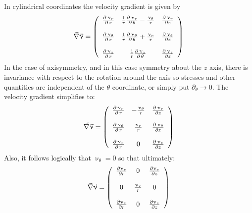 In cylindrical coordinates the velocity gradient is given by 
\begin{equation}
\vec\nabla \vec{\upnu}  =
\left(
\begin{array}{ccc}
{\partial \, \upnu_r \over \partial \, r} &
{1 \over r} {\partial \, \upnu_r \over \partial \, \theta} - {\upnu_{\theta} \over r} &
{\partial \, \upnu_r \over \partial z} \\
\\
{\partial \, \upnu_{\theta} \over \partial \, r} &
{1 \over r} {\partial \, \upnu_{\theta} \over \partial \, \theta} + 
{\upnu_r \over r} &
{\partial \, \upnu_{\theta} \over \partial z} \\
\\
{\partial \, \upnu_{z} \over \partial \, r} &
{1 \over r} {\partial \, \upnu_{z} \over \partial \, \theta} &
{\partial \, \upnu_{z} \over \partial z}
\end{array}
\right)
\end{equation}
In the case of axisymmetry, and in this case symmetry about the $z$ axis, there is invariance with respect to the rotation around the axis so stresses and other quantities are independent of the $\theta$ coordinate, or simply put $\partial_\theta \rightarrow 0$.
The velocity gradient simplifies to:
\begin{equation}
\vec\nabla \vec{\upnu}  =
\left(
\begin{array}{ccc}
{\partial \, \upnu_r \over \partial \, r} &
- {\upnu_{\theta} \over r} &
{\partial \, \upnu_r \over \partial z} \\
\\
{\partial \, \upnu_{\theta} \over \partial \, r} &
{\upnu_r \over r} &
{\partial \, \upnu_{\theta} \over \partial z} \\
\\
{\partial \, \upnu_{z} \over \partial \, r} &
0 &
{\partial \, \upnu_{z} \over \partial z}
\end{array}
\right)
\end{equation}
Also, it follows logically that $\upnu_\theta=0$ so that ultimately:
\begin{equation}
\vec\nabla \vec{\upnu}  =
\left(
\begin{array}{ccc}
\frac{\partial \upnu_r}{\partial r} & 0 & {\partial \upnu_r \over \partial z} \\\\
0 & {\upnu_r \over r} & 0 \\ \\
{\partial \upnu_{z} \over \partial  r} & 0 & {\partial  \upnu_{z} \over \partial z}
\end{array}
\right)
\end{equation}
